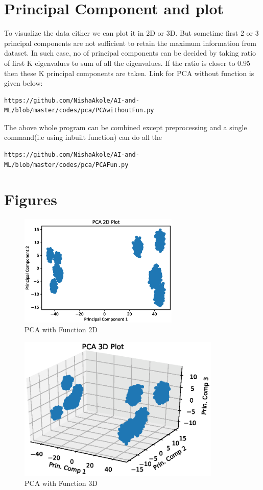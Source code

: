 \documentclass[journal,12pt,twocolumn]{IEEEtran}
\begin{document}
\section{Principal Component and plot}
To visualize the data either we can plot it in 2D or 3D. But sometime first 2 or 3 principal components are not sufficient to retain the maximum information from dataset. In such case, no of principal components can be decided by taking ratio of first K eigenvalues to sum of all the eigenvalues. If the ratio is closer to 0.95 then these K principal components are taken. Link for PCA without function is given below:
\begin{lstlisting}[mathescape=true]
https://github.com/NishaAkole/AI-and-ML/blob/master/codes/pca/PCAwithoutFun.py
\end{lstlisting}
  
The above whole program can be combined except preprocessing and a single command(i.e using inbuilt function) can do all the  
\begin{lstlisting}[mathescape=true]
https://github.com/NishaAkole/AI-and-ML/blob/master/codes/pca/PCAFun.py
\end{lstlisting}

\section{Figures}
\begin{figure}[!h]
\begin{center}
\includegraphics[width=3in]{./figs/PCA_2D.eps}
\end{center}
\caption{PCA with Function 2D}
\label{fig: 2D Plot}
\end{figure}

\begin{figure}[!h]
\begin{center}
\includegraphics[width=3.8in]{./figs/PCA_3D.eps}
\end{center}
\caption{PCA with Function 3D}
\label{fig: 3D Plot}
\end{figure}
\end{document}
